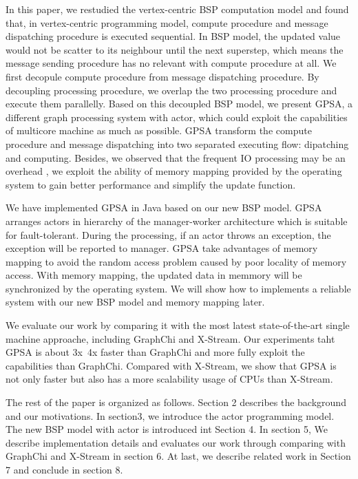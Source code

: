 \documentclass[twocolumn,a4paper,10pt]{article}
\begin{document}
In this paper, we restudied the vertex-centric BSP computation model and found that, in vertex-centric programming model, compute procedure and message dispatching procedure is executed sequential\cite{xstream}. In BSP model, the updated value would not be scatter to its neighbour until the next superstep, which means the message sending procedure has no relevant with compute procedure at all. We first decopule compute procedure from message dispatching procedure. By decoupling processing procedure, we overlap the two processing procedure and execute them parallelly. Based on this decoupled BSP model, we present GPSA, a different graph processing system with actor, which could exploit the capabilities of multicore machine as much as possible. GPSA transform the compute procedure and message dispatching into two separated executing flow: dipatching and computing. Besides, we observed that the frequent IO processing may be an overhead , we exploit the ability of memory mapping provided by the operating system to gain better performance and simplify the update function.
\newline

We have implemented GPSA in Java based on our new BSP model. GPSA arranges actors in hierarchy of the manager-worker architecture which is suitable for fault-tolerant. During the processing, if an actor throws an exception, the exception will be reported to manager. GPSA take advantages of memory mapping to avoid the random access problem caused by poor locality of memory access. With memory mapping, the updated data in memmory will be synchronized by the operating system. We will show how to implements a reliable system with our new BSP model and memory mapping later.\newline

We evaluate our work by comparing it with the most latest state-of-the-art single machine approache, including GraphChi and X-Stream. Our experiments taht GPSA is about 3x~4x faster than GraphChi and more fully exploit the capabilities than GraphChi. Compared with X-Stream, we show that GPSA is not only faster but also has a more scalability usage of CPUs than X-Stream.\newline

The rest of the paper is organized as follows. Section 2 describes the background and our motivations. In section3, we introduce the actor programming model. The new BSP model with actor is introduced int Section 4. In section 5, We describe implementation details and evaluates our work through comparing with GraphChi and X-Stream in section 6.  At last, we describe related work in Section 7 and conclude in section 8.
\end{document}
